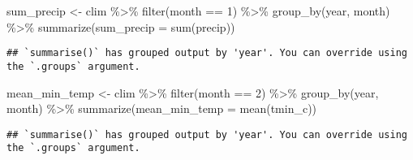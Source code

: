 \documentclass[
]{article}
\newenvironment{Shaded}{\begin{snugshade}}{\end{snugshade}}
\newcommand{\AttributeTok}[1]{\textcolor[rgb]{0.77,0.63,0.00}{#1}}
\newcommand{\DecValTok}[1]{\textcolor[rgb]{0.00,0.00,0.81}{#1}}
\newcommand{\FunctionTok}[1]{\textcolor[rgb]{0.00,0.00,0.00}{#1}}
\newcommand{\NormalTok}[1]{#1}
\newcommand{\OtherTok}[1]{\textcolor[rgb]{0.56,0.35,0.01}{#1}}
\newcommand{\SpecialCharTok}[1]{\textcolor[rgb]{0.00,0.00,0.00}{#1}}
\begin{document}
\begin{Shaded}
\begin{Highlighting}[]
\NormalTok{sum\_precip }\OtherTok{\textless{}{-}}\NormalTok{ clim }\SpecialCharTok{\%\textgreater{}\%} 
  \FunctionTok{filter}\NormalTok{(month }\SpecialCharTok{==} \DecValTok{1}\NormalTok{) }\SpecialCharTok{\%\textgreater{}\%} 
  \FunctionTok{group\_by}\NormalTok{(year, month) }\SpecialCharTok{\%\textgreater{}\%} 
  \FunctionTok{summarize}\NormalTok{(}\AttributeTok{sum\_precip =} \FunctionTok{sum}\NormalTok{(precip))}
\end{Highlighting}
\end{Shaded}

\begin{verbatim}
## `summarise()` has grouped output by 'year'. You can override using the `.groups` argument.
\end{verbatim}

\begin{Shaded}
\begin{Highlighting}[]
\NormalTok{mean\_min\_temp }\OtherTok{\textless{}{-}}\NormalTok{ clim }\SpecialCharTok{\%\textgreater{}\%} 
  \FunctionTok{filter}\NormalTok{(month }\SpecialCharTok{==} \DecValTok{2}\NormalTok{) }\SpecialCharTok{\%\textgreater{}\%} 
  \FunctionTok{group\_by}\NormalTok{(year, month) }\SpecialCharTok{\%\textgreater{}\%} 
  \FunctionTok{summarize}\NormalTok{(}\AttributeTok{mean\_min\_temp =} \FunctionTok{mean}\NormalTok{(tmin\_c))}
\end{Highlighting}
\end{Shaded}

\begin{verbatim}
## `summarise()` has grouped output by 'year'. You can override using the `.groups` argument.
\end{verbatim}
\end{document}
